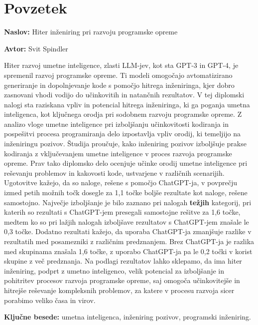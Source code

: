 \documentclass[a4paper,12pt,openright]{book}
\newcommand{\ttitle}{Hiter inženiring pri razvoju programske opreme}
\newcommand{\tauthor}{Svit Spindler}
\newcommand{\tkeywords}{umetna inteligenca, inženiring pozivov, programski inženiring}
\newcommand{\clearemptydoublepage}{\newpage{\pagestyle{empty}\cleardoublepage}}
\begin{document}
\clearemptydoublepage

{}
\chapter*{Povzetek}

\noindent\textbf{Naslov:} \ttitle
\bigskip

\noindent\textbf{Avtor:} \tauthor
\bigskip

Hiter razvoj umetne inteligence, zlasti LLM-jev, kot sta GPT-3 in GPT-4, je spremenil razvoj programske opreme. Ti modeli omogočajo avtomatizirano generiranje in dopolnjevanje kode s pomočjo hitrega inženiringa, kjer dobro zasnovani vhodi vodijo do učinkovitih in natančnih rezultatov. V tej diplomski nalogi sta raziskana vpliv in potencial hitrega inženiringa, ki ga poganja umetna inteligenca, kot ključnega orodja pri sodobnem razvoju programske opreme. Z analizo vloge umetne inteligence pri izboljšanju učinkovitosti kodiranja in pospešitvi procesa programiranja delo izpostavlja vpliv orodij, ki temeljijo na inženiringu pozivov. Študija proučuje, kako inženiring pozivov izboljšuje prakse kodiranja z vključevanjem umetne inteligence v proces razvoja programske opreme. Prav tako diplomsko delo ocenjuje učinke orodij umetne inteligence pri reševanju problemov in kakovosti kode, ustvarjene v različnih scenarijih. 
Ugotovitve kažejo, da so naloge, rešene s pomočjo ChatGPT-ja, v povprečju izmed petih možnih točk dosegle za 1,1 točke boljše rezultate kot naloge, rešene samostojno. 
Največje izboljšanje je bilo zaznano pri nalogah \textbf{težjih} kategorij, pri katerih so rezultati s ChatGPT-jem presegali samostojne rešitve za 1,6 točke, medtem ko so pri lažjih nalogah izboljšave rezultatov s ChatGPT-jem znašale le 0,3 točke.
Dodatno rezultati kažejo, da uporaba ChatGPT-ja zmanjšuje razlike v rezultatih med posamezniki z različnim predznanjem. Brez ChatGPT-ja je razlika med skupinama znašala 1,6 točke, z uporabo ChatGPT-ja pa le 0,2 točki v korist skupine z več predznanja. Na podlagi rezultatov lahko sklepamo, da ima hiter inženiring, podprt z umetno inteligenco, velik potencial za izboljšanje in pohitritev procesov razvoja programske opreme, saj omogoča učinkovitejše in hitrejše reševanje kompleksnih problemov, za katere v procesu razvoja sicer porabimo veliko časa in virov.

\bigskip

\noindent\textbf{Ključne besede:} \tkeywords.
\clearemptydoublepage
\end{document}
